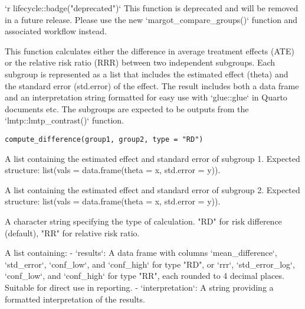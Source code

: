 \documentclass[a4paper]{book}
\begin{document}
%
\begin{Description}
`r lifecycle::badge("deprecated")`
This function is deprecated and will be removed in a future release.
Please use the new `margot\_compare\_groups()` function and associated workflow instead.

This function calculates either the difference in average treatment effects (ATE) or the relative risk ratio (RRR)
between two independent subgroups. Each subgroup is represented as a list that includes the estimated effect (theta) and
the standard error (std.error) of the effect. The result includes both a data frame and an interpretation
string formatted for easy use with `glue::glue` in Quarto documents etc. The subgroups are expected to be
outputs from the `lmtp::lmtp\_contrast()` function.
\end{Description}
%
\begin{Usage}
\begin{verbatim}
compute_difference(group1, group2, type = "RD")
\end{verbatim}
\end{Usage}
%
\begin{Arguments}
\begin{ldescription}
\item[\code{group1}] A list containing the estimated effect and standard error of subgroup 1.
Expected structure: list(vals = data.frame(theta = x, std.error = y)).

\item[\code{group2}] A list containing the estimated effect and standard error of subgroup 2.
Expected structure: list(vals = data.frame(theta = x, std.error = y)).

\item[\code{type}] A character string specifying the type of calculation. "RD" for risk difference (default),
"RR" for relative risk ratio.
\end{ldescription}
\end{Arguments}
%
\begin{Value}
A list containing:
- `results`: A data frame with columns `mean\_difference`, `std\_error`, `conf\_low`, and `conf\_high` for type "RD",
or `rrr`, `std\_error\_log`, `conf\_low`, and `conf\_high` for type "RR", each rounded to 4 decimal places.
Suitable for direct use in reporting.
- `interpretation`: A string providing a formatted interpretation of the results.
\end{Value}
\end{document}
